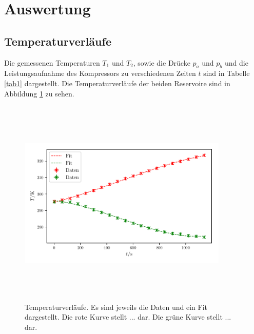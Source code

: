 \section{Auswertung}
\label{sec:Auswertung}

\subsection{Temperaturverläufe}
Die gemessenen Temperaturen $T_1$ und $T_2$, sowie die Drücke
$p_a$ und $p_b$ und die Leistungsaufnahme des Kompressors
zu verschiedenen Zeiten $t$ sind in Tabelle \ref{tab1}
dargestellt.
\newline
Die Temperaturverläufe der beiden Reservoire sind in Abbildung
\ref{fig:plot1} zu sehen.
%

\begin{figure}
    \centering
    \includegraphics[width=10cm, height=10cm]{build/plot1.pdf}
    \caption{Temperaturverläufe. Es sind jeweils die Daten und ein Fit dargestellt.
    Die rote Kurve stellt ... dar. Die grüne Kurve stellt ... dar.
    }
    \label{fig:plot1}
\end{figure}

